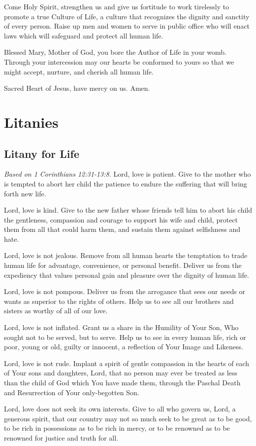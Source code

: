 \documentclass[12pt]{article}
\newcommand{\prayersection}[1]{\section{#1}}
\newcommand{\prayertitle}[1]{\subsection{#1}}
\newcommand{\emphasis}[1]{\emph{#1}}
\newcommand{\emphasis}[1]{\textsl{#1}}
\newcommand{\note}[1]{{\small{\emphasis{#1}}}\newline}
\begin{document}
Come Holy Spirit, strengthen us and give us fortitude to work tirelessly to promote a true Culture of Life, a culture that recognizes the dignity and sanctity of every person.
Raise up men and women to serve in public office who will enact laws which will safeguard and protect all human life.

Blessed Mary, Mother of God, you bore the Author of Life in your womb. 
Through your intercession may our hearts be conformed to yours so that we might accept, nurture, and cherish all human life.

Sacred Heart of Jesus, have mercy on us. Amen.

\newpage

\prayersection{Litanies}
\prayertitle{Litany for Life}
\label{prayer:litany_for_life}
\note{Based on 1 Corinthians 12:31-13:8.}
Lord, love is patient.
Give to the mother who is tempted to abort her child the patience to endure the suffering that will bring forth new life.

Lord, love is kind.
Give to the new father whose friends tell him to abort his child the gentleness, compassion and courage to support his wife and child, protect them from all that could harm them, and sustain them against selfishness and hate.

Lord, love is not jealous.
Remove from all human hearts the temptation to trade human life for advantage, convenience, or personal benefit.
Deliver us from the expediency that values personal gain and pleasure over the dignity of human life.

Lord, love is not pompous.
Deliver us from the arrogance that sees our needs or wants as superior to the rights of others.
Help us to see all our brothers and sisters as worthy of all of our love.

Lord, love is not inflated.
Grant us a share in the Humility of Your Son, Who sought not to be served, but to serve. Help us to see in every human life, rich or poor, young or old, guilty or innocent, a reflection of Your Image and Likeness. 

Lord, love is not rude.
Implant a spirit of gentle compassion in the hearts of each of Your sons and daughters, Lord, that no person may ever be treated as less than the child of God which You have made them, through the Paschal Death and Resurrection of Your only-begotten Son.

Lord, love does not seek its own interests.
Give to all who govern us, Lord, a generous spirit, that our country may not so much seek to be great as to be good, to be rich in possessions as to be rich in mercy, or to be renowned as to be renowned for justice and truth for all.
\end{document}
